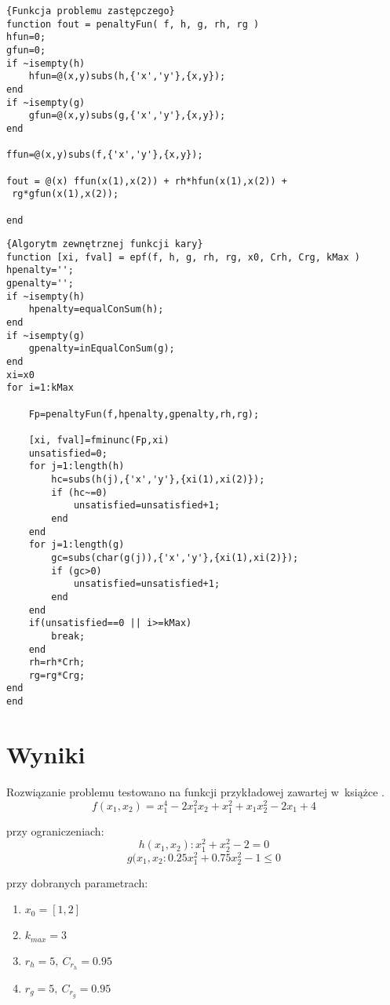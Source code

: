 \documentclass{classrep}
\begin{document}
\begin{lstlisting}{Funkcja problemu zastępczego}
function fout = penaltyFun( f, h, g, rh, rg )
hfun=0;
gfun=0;
if ~isempty(h)
    hfun=@(x,y)subs(h,{'x','y'},{x,y});
end
if ~isempty(g)
    gfun=@(x,y)subs(g,{'x','y'},{x,y});
end

ffun=@(x,y)subs(f,{'x','y'},{x,y});

fout = @(x) ffun(x(1),x(2)) + rh*hfun(x(1),x(2)) +
 rg*gfun(x(1),x(2));

end

\end{lstlisting}

\begin{lstlisting}{Algorytm zewnętrznej funkcji kary}
function [xi, fval] = epf(f, h, g, rh, rg, x0, Crh, Crg, kMax )
hpenalty='';
gpenalty='';
if ~isempty(h)
    hpenalty=equalConSum(h);
end
if ~isempty(g)
    gpenalty=inEqualConSum(g);
end
xi=x0
for i=1:kMax

    Fp=penaltyFun(f,hpenalty,gpenalty,rh,rg);
    
    [xi, fval]=fminunc(Fp,xi)
    unsatisfied=0;
    for j=1:length(h)
        hc=subs(h(j),{'x','y'},{xi(1),xi(2)});
        if (hc~=0)
            unsatisfied=unsatisfied+1;
        end
    end
    for j=1:length(g)
        gc=subs(char(g(j)),{'x','y'},{xi(1),xi(2)});
        if (gc>0)
            unsatisfied=unsatisfied+1;
        end
    end
    if(unsatisfied==0 || i>=kMax)
        break;
    end
    rh=rh*Crh;
    rg=rg*Crg;
end
end
\end{lstlisting}

\section{Wyniki}

Rozwiązanie problemu testowano na funkcji przykładowej zawartej w~książce \cite{3}.
\begin{equation}
f(x_1, x_2) = x^4 _1 - 2 x^2 _1 x_2 + x^2 _1 + x_1 x^2 _2 - 2x_1 +4
\end{equation}

\noindent przy ograniczeniach:
\begin{equation*}
h(x_1, x_2): x^2 _1 + x^2 _2 -2 = 0
\end{equation*}
\begin{equation*}
g(x_1, x_2: 0.25x^2 _1 + 0.75 x^2 _2 -1 \leq 0
\end{equation*}

\noindent przy dobranych parametrach:
\begin{enumerate}
\item $x_0 = [1, 2]$
\item $k_{max}=3$
\item $r_h=5,\ C_{r_h}=0.95$
\item $r_g=5,\ C_{r_g}=0.95$
\end{enumerate}
\end{document}
